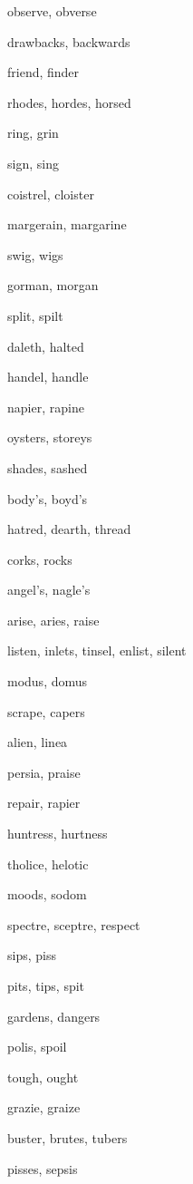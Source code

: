     \item observe, obverse
    \item drawbacks, backwards
    \item friend, finder
    \item rhodes, hordes, horsed
    \item ring, grin
    \item sign, sing
    \item coistrel, cloister
    \item margerain, margarine
    \item swig, wigs
    \item gorman, morgan
    \item split, spilt
    \item daleth, halted
    \item handel, handle
    \item napier, rapine
    \item oysters, storeys
    \item shades, sashed
    \item body's, boyd's
    \item hatred, dearth, thread
    \item corks, rocks
    \item angel's, nagle's
    \item arise, aries, raise
    \item listen, inlets, tinsel, enlist, silent
    \item modus, domus
    \item scrape, capers
    \item alien, linea
    \item persia, praise
    \item repair, rapier
    \item huntress, hurtness
    \item tholice, helotic
    \item moods, sodom
    \item spectre, sceptre, respect
    \item sips, piss
    \item pits, tips, spit
    \item gardens, dangers
    \item polis, spoil
    \item tough, ought
    \item grazie, graize
    \item buster, brutes, tubers
    \item pisses, sepsis
